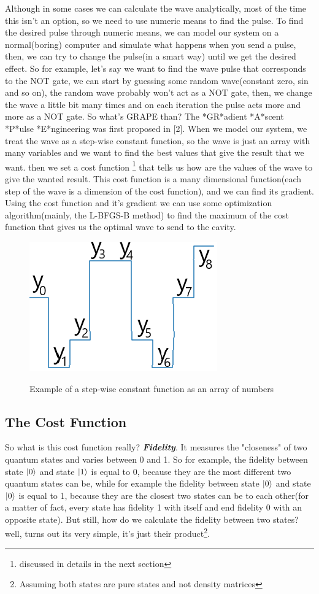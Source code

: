 \documentclass[english, a4paper, 12pt, twoside]{article}
\numberwithin{equation}{section} %
\begin{document}
Although in some cases we can calculate the wave analytically, most of the time this isn't an option, so we need to use numeric means to find the pulse. To find the desired pulse through numeric means, we can model our system on a normal(boring) computer and simulate what happens when you send a pulse, then, we can try to change the pulse(in a smart way) until we get the desired effect. So for example, let's say we want to find the wave pulse that corresponds to the NOT gate, we can start by guessing some random wave(constant zero, sin and so on), the random wave probably won't act as a NOT gate, then, we change the wave a little bit many times and on each iteration the pulse acts more and more as a NOT gate.
So what's GRAPE than? The *GR*adient *A*scent *P*ulse *E*ngineering was first proposed in [2]. When we model our system, we treat the wave as a step-wise constant function, so the wave is just an array with many variables and we want to find the best values that give the result that we want. then we set a cost function \footnote{discussed in details in the next section} that tells us how are the values of the wave to give the wanted result. This cost function is a many dimensional function(each step of the wave is a dimension of the cost function), and we can find its gradient. Using the cost function and it's gradient we can use some optimization algorithm(mainly, the L-BFGS-B method) to find the maximum of the cost function that gives us the optimal wave to send to the cavity.

\begin{figure}[H]
    \centering
    \caption{Example of a step-wise constant function as an array of numbers}
    \includegraphics[width=0.3\columnwidth]{step-wise_example.png} %
    \label{fig:step-wise-const}
\end{figure}

\subsection{The Cost Function}
So what is this cost function really? \textit{\textbf{Fidelity}}. It measures the "closeness" of two quantum states and varies between 0 and 1. So for example, the fidelity between state $\ket{0}$ and state $\ket{1}$ is equal to 0, because they are the most different two quantum states can be, while for example the fidelity between state $\ket{0}$ and state $\ket{0}$ is equal to 1, because they are the closest two states can be to each other(for a matter of fact, every state has fidelity 1 with itself and end fidelity 0 with an opposite state). But still, how do we calculate the fidelity between two states? well, turns out its very simple, it's just their product\footnote{Assuming both states are pure states and not density matrices}.
\end{document}
